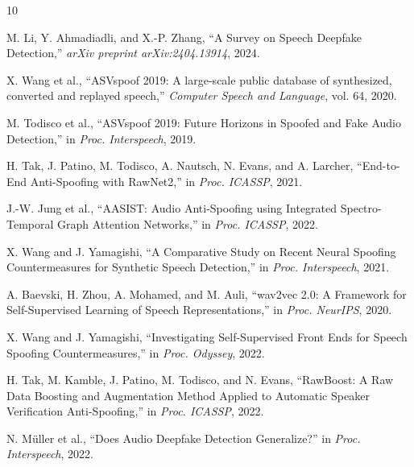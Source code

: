 \documentclass[sigconf]{acmart}
\begin{document}
\begin{thebibliography}{10}

M. Li, Y. Ahmadiadli, and X.-P. Zhang,
``A Survey on Speech Deepfake Detection,''
\textit{arXiv preprint arXiv:2404.13914}, 2024.

X. Wang et al.,
``ASVspoof 2019: A large-scale public database of synthesized, converted and replayed speech,''
\textit{Computer Speech and Language}, vol. 64, 2020.

M. Todisco et al.,
``ASVspoof 2019: Future Horizons in Spoofed and Fake Audio Detection,''
in \textit{Proc. Interspeech}, 2019.

H. Tak, J. Patino, M. Todisco, A. Nautsch, N. Evans, and A. Larcher,
``End-to-End Anti-Spoofing with RawNet2,''
in \textit{Proc. ICASSP}, 2021.

J.-W. Jung et al.,
``AASIST: Audio Anti-Spoofing using Integrated Spectro-Temporal Graph Attention Networks,''
in \textit{Proc. ICASSP}, 2022.

X. Wang and J. Yamagishi,
``A Comparative Study on Recent Neural Spoofing Countermeasures for Synthetic Speech Detection,''
in \textit{Proc. Interspeech}, 2021.

A. Baevski, H. Zhou, A. Mohamed, and M. Auli,
``wav2vec 2.0: A Framework for Self-Supervised Learning of Speech Representations,''
in \textit{Proc. NeurIPS}, 2020.

X. Wang and J. Yamagishi,
``Investigating Self-Supervised Front Ends for Speech Spoofing Countermeasures,''
in \textit{Proc. Odyssey}, 2022.

H. Tak, M. Kamble, J. Patino, M. Todisco, and N. Evans,
``RawBoost: A Raw Data Boosting and Augmentation Method Applied to Automatic Speaker Verification Anti-Spoofing,''
in \textit{Proc. ICASSP}, 2022.

N. Müller et al.,
``Does Audio Deepfake Detection Generalize?''
in \textit{Proc. Interspeech}, 2022.

\end{thebibliography}
\end{document}
